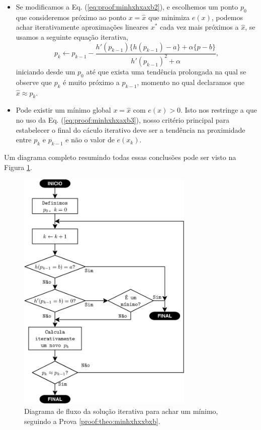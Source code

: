 \begin{myproofT}
\begin{itemize}
\item Se modificamos a Eq. (\ref{eq:proof:minhxhxaxb2}), e escolhemos um ponto  
$p_0$ que consideremos próximo ao ponto $x=\hat{x}$ que minimiza $e(x)$,
podemos achar iterativamente aproximações lineares $x^*$ cada vez mais próximos a  $\hat{x}$,
se usamos a seguinte equação iterativa,
\begin{equation}\label{eq:proof:minhxhxaxb3}
p_{k} \leftarrow p_{k-1} - \frac{ h'(p_{k-1})\{h(p_{k-1})-a\}+\alpha\{p-b\}}{h'(p_{k-1})^2+\alpha},
\end{equation}
iniciando desde um $p_{0}$ 
até que exista uma tendência prolongada na qual se observe que $p_{k}$ é muito próximo a $p_{k-1}$,
momento no qual declaramos que $\hat{x} \approx p_{k}$.
\item Pode existir um mínimo global $x=\hat{x}$ com $e(x)>0$.
Isto nos restringe a que no uso da Eq. (\ref{eq:proof:minhxhxaxb3}),
nosso critério principal para estabelecer o final do cáculo iterativo
deve ser a tendência na  proximidade entre $p_{k}$ e $p_{k-1}$ 
e não o valor de $e(x_k)$.
\end{itemize}

Um diagrama completo resumindo todas essas conclusões pode ser visto na Figura \ref{fig:fluxohx2}.
\end{myproofT}



\begin{figure}[!h]
     \centering
         \includegraphics[width=0.75\textwidth]{chapters/minimization-hx/fluxo2.eps}
        \caption{Diagrama de fluxo da solução iterativa para achar um mínimo, seguindo a Prova \ref{proof:theo:minhxhxxbxb}.}
        \label{fig:fluxohx2}
\end{figure}


